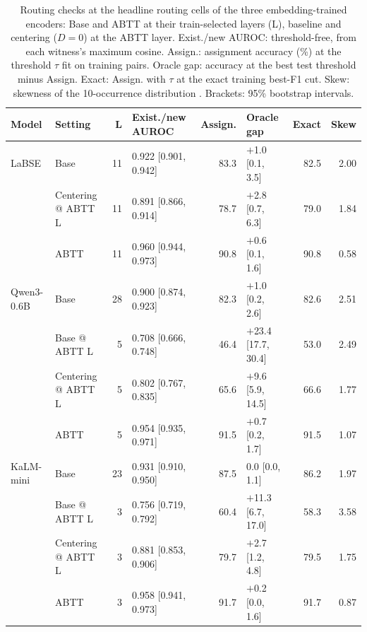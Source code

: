 \begin{table}[t]
\centering
\scriptsize
\setlength{\tabcolsep}{2.5pt}
\begin{tabular}{llrlrlrr}
\toprule
\textbf{Model} & \textbf{Setting} & \textbf{L} & Exist./new AUROC & Assign. & Oracle gap & Exact & Skew \\
\midrule
LaBSE & Base & 11 & 0.922 [0.901, 0.942] & 83.3 & $+$1.0 [0.1, 3.5] & 82.5 & 2.00 \\
 & Centering @ ABTT L & 11 & 0.891 [0.866, 0.914] & 78.7 & $+$2.8 [0.7, 6.3] & 79.0 & 1.84 \\
 & ABTT & 11 & 0.960 [0.944, 0.973] & 90.8 & $+$0.6 [0.1, 1.6] & 90.8 & 0.58 \\
\addlinespace
Qwen3-0.6B & Base & 28 & 0.900 [0.874, 0.923] & 82.3 & $+$1.0 [0.2, 2.6] & 82.6 & 2.51 \\
 & Base @ ABTT L & 5 & 0.708 [0.666, 0.748] & 46.4 & $+$23.4 [17.7, 30.4] & 53.0 & 2.49 \\
 & Centering @ ABTT L & 5 & 0.802 [0.767, 0.835] & 65.6 & $+$9.6 [5.9, 14.5] & 66.6 & 1.77 \\
 & ABTT & 5 & 0.954 [0.935, 0.971] & 91.5 & $+$0.7 [0.2, 1.7] & 91.5 & 1.07 \\
\addlinespace
KaLM-mini & Base & 23 & 0.931 [0.910, 0.950] & 87.5 & 0.0 [0.0, 1.1] & 86.2 & 1.97 \\
 & Base @ ABTT L & 3 & 0.756 [0.719, 0.792] & 60.4 & $+$11.3 [6.7, 17.0] & 58.3 & 3.58 \\
 & Centering @ ABTT L & 3 & 0.881 [0.853, 0.906] & 79.7 & $+$2.7 [1.2, 4.8] & 79.5 & 1.75 \\
 & ABTT & 3 & 0.958 [0.941, 0.973] & 91.7 & $+$0.2 [0.0, 1.6] & 91.7 & 0.87 \\
\bottomrule
\end{tabular}
\caption{Routing checks at the headline routing cells of the three embedding-trained encoders: Base and ABTT at their train-selected layers (L), baseline and centering ($D=0$) at the ABTT layer. Exist./new AUROC: threshold-free, from each witness's maximum cosine. Assign.: assignment accuracy (\%) at the threshold $\tau$ fit on training pairs. Oracle gap: accuracy at the best test threshold minus Assign. Exact: Assign. with $\tau$ at the exact training best-F1 cut. Skew: skewness of the 10-occurrence distribution \citep{radovanovic2010hubs}. Brackets: 95\% bootstrap intervals.}
\label{tab:pq_routing}
\end{table}
